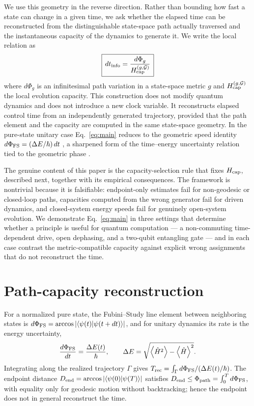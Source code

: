 \documentclass[12pt]{article}
\begin{document}
We use this geometry in the reverse direction. Rather than bounding how fast a state can change in a given time, we ask whether the elapsed time can be reconstructed from the distinguishable state-space path actually traversed and the instantaneous capacity of the dynamics to generate it. We write the local relation as
\begin{equation}
    \boxed{\,dt_{\rm info}=\frac{d\Phi_g}{H_{\rm cap}^{(g,\mathcal G)}}\,}
    \label{eq:main}
\end{equation}
where \(d\Phi_g\) is an infinitesimal path variation in a state-space metric \(g\) and \(H_{\rm cap}^{(g,\mathcal G)}\) the local evolution capacity. This construction does not modify quantum dynamics and does not introduce a new clock variable. It reconstructs elapsed control time from an independently generated trajectory, provided that the path element and the capacity are computed in the same state-space geometry. In the pure-state unitary case Eq.~\eqref{eq:main} reduces to the geometric speed identity \(d\Phi_{\rm FS}=(\Delta E/\hbar)\,dt\) \cite{AnandanAharonov1990}, a sharpened form of the time--energy uncertainty relation tied to the geometric phase \cite{Berry1984}.

The genuine content of this paper is the capacity-selection rule that fixes \(H_{\rm cap}\), described next, together with its empirical consequences. The framework is nontrivial because it is falsifiable: endpoint-only estimates fail for non-geodesic or closed-loop paths, capacities computed from the wrong generator fail for driven dynamics, and closed-system energy speeds fail for genuinely open-system evolution. We demonstrate Eq.~\eqref{eq:main} in three settings that determine whether a principle is useful for quantum computation --- a non-commuting time-dependent drive, open dephasing, and a two-qubit entangling gate --- and in each case contrast the metric-compatible capacity against explicit wrong assignments that do not reconstruct the time.

\section{Path-capacity reconstruction}

For a normalized pure state, the Fubini--Study line element between neighboring states is \(d\Phi_{\rm FS}=\arccos\abs{\braket{\psi(t)}{\psi(t+dt)}}\), and for unitary dynamics its rate is the energy uncertainty,
\begin{equation}
    \frac{d\Phi_{\rm FS}}{dt}=\frac{\Delta E(t)}{\hbar},\qquad
    \Delta E=\sqrt{\expectationvalue{\hat H^2}-\expectationvalue{\hat H}^2}.
    \label{eq:aa}
\end{equation}
Integrating along the realized trajectory \(\Gamma\) gives \(T_{\rm rec}=\int_\Gamma d\Phi_{\rm FS}/(\Delta E(t)/\hbar)\). The endpoint distance \(D_{\rm end}=\arccos\abs{\braket{\psi(0)}{\psi(T)}}\) satisfies \(D_{\rm end}\le\Phi_{\rm path}=\int_0^T d\Phi_{\rm FS}\), with equality only for geodesic motion without backtracking; hence the endpoint does not in general reconstruct the time.
\end{document}
